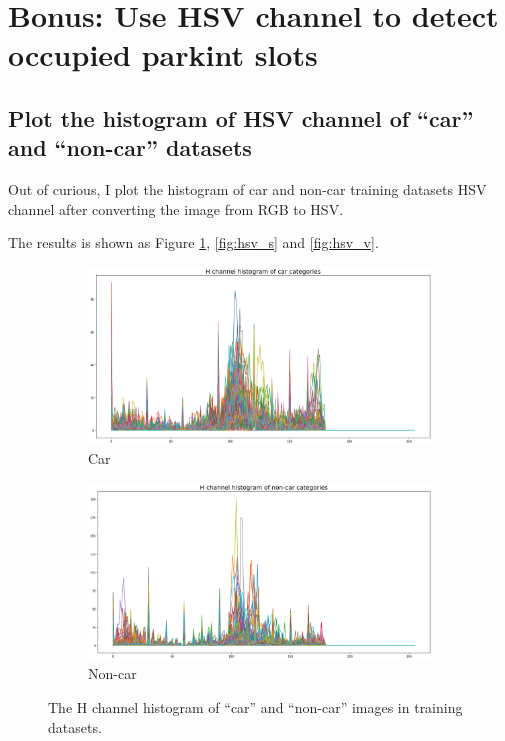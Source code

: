 \documentclass{article}[12pt, twocolumn]
\begin{document}
\section{Bonus: Use HSV channel to detect occupied parkint slots}

\subsection{Plot the histogram of HSV channel of ``car'' and ``non-car'' datasets}

Out of curious, I plot the histogram of car and non-car training datasets HSV channel after converting
the image from RGB to HSV. 

The results is shown as Figure \ref{fig:hsv_h}, \ref{fig:hsv_s} and \ref{fig:hsv_v}.

\begin{figure}[H]
    \centering
    \begin{subfigure}[b]{0.45\textwidth}
        \centering
        \includegraphics[width=\textwidth]{figure/H_car.png}
        \caption{Car}
    \end{subfigure}
    \hfill
    \begin{subfigure}[b]{0.45\textwidth}
        \centering
        \includegraphics[width=\textwidth]{figure/H_noncar.png}
        \caption{Non-car}
    \end{subfigure}
    \caption{The H channel histogram of ``car'' and ``non-car'' images in training datasets.}
    \label{fig:hsv_h}
\end{figure}
\end{document}
